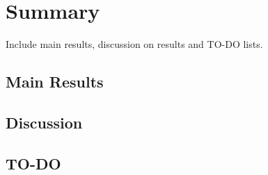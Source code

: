 \chapter{Summary}
Include main results, discussion on results and TO-DO lists.
\section{Main Results}

\section{Discussion}

\section{TO-DO}